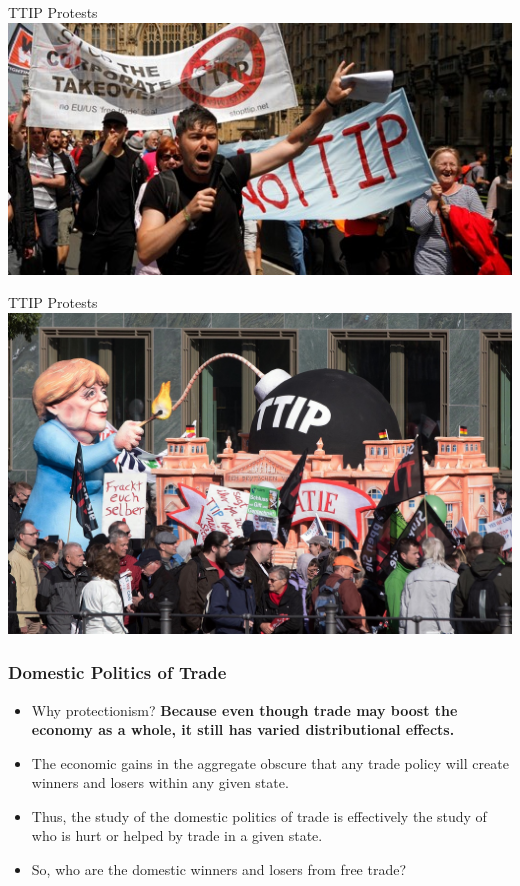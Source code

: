 \documentclass{beamer}
\begin{document}
\begin{frame}{\LARGE TTIP Protests}
	\centering
	\includegraphics[width=\textwidth,height=0.8\textheight,keepaspectratio]{ttip1.jpg}
\end{frame}

\begin{frame}{\LARGE TTIP Protests}
	\centering
	\includegraphics[width=\textwidth,height=0.8\textheight,keepaspectratio]{TTIP-Protests-Berlin.jpg}
\end{frame}

\begin{frame} 
	\frametitle{\LARGE{Domestic Politics of Trade}}
	\begin{itemize}
		\item Why protectionism? \textbf{Because even though trade may boost the economy as a whole, it still has varied distributional effects.} \pause
		\item The economic gains in the aggregate obscure that any trade policy will create winners and losers within any given state. \pause
		\item Thus, the study of the domestic politics of trade is effectively the study of who is hurt or helped by trade in a given state. \pause
		\item So, who are the domestic winners and losers from free trade?
	\end{itemize}
\end{frame}
\end{document}

